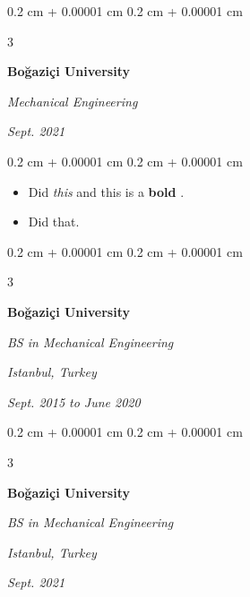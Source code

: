 \documentclass[10pt, letterpaper]{article}
\newenvironment{highlights}{
    \begin{itemize}[
        topsep=0.10 cm,
        parsep=0.10 cm,
        partopsep=0pt,
        itemsep=0pt,
        leftmargin=0.4 cm + 10pt + 0.6 cm
    ]
}{
    \end{itemize}
} %
\newenvironment{onecolentry}{
    \begin{adjustwidth}{
        0.2 cm + 0.00001 cm
    }{
        0.2 cm + 0.00001 cm
    }
}{
    \end{adjustwidth}
} %
\newenvironment{threecolentry}[3][]{
    \onecolentry
    \def\thirdColumn{#3}
    \setcolumnwidth{0.6 cm, \fill, 4.5 cm}
    \begin{paracol}{3}
    #2 \switchcolumn
}{
    \switchcolumn \raggedleft \thirdColumn
    \end{paracol}
    \endonecolentry
} %
\let\hrefWithoutArrow\href
\renewcommand{\href}[2]{\hrefWithoutArrow{#1}{\mbox{\ifthenelse{\equal{#2}{}}{ }{#2 }\raisebox{.15ex}{\footnotesize \faExternalLink*}}}}
\begin{document}
        \vspace{0.2 cm-3px}

        \begin{threecolentry}{
            \vspace*{\fill}
            \textbullet
            \vspace*{3px}
            \vspace*{\fill}
        }{
            
            
        \textit{Sept. 2021}}
            \textbf{Boğaziçi University}

            \textit{Mechanical Engineering}
        \end{threecolentry}

        \vspace{0.10 cm-3px}
        \begin{onecolentry}
            \begin{highlights}
                \item Did \textit{this} and this is a \textbf{bold} \href{https://example.com}{link}.
                \item Did that.
            \end{highlights}
        \end{onecolentry}


        \vspace{0.2 cm-3px}

        \begin{threecolentry}{
            \vspace*{\fill}
            \textbullet
            \vspace*{3px}
            \vspace*{\fill}
        }{
        \textit{Istanbul, Turkey}    
            
        \textit{Sept. 2015 to June 2020}}
            \textbf{Boğaziçi University}

            \textit{BS in Mechanical Engineering}
        \end{threecolentry}



        \vspace{0.2 cm-3px}

        \begin{threecolentry}{
            \vspace*{\fill}
            \textbullet
            \vspace*{3px}
            \vspace*{\fill}
        }{
        \textit{Istanbul, Turkey}    
            
        \textit{Sept. 2021}}
            \textbf{Boğaziçi University}

            \textit{BS in Mechanical Engineering}
        \end{threecolentry}
\end{document}
